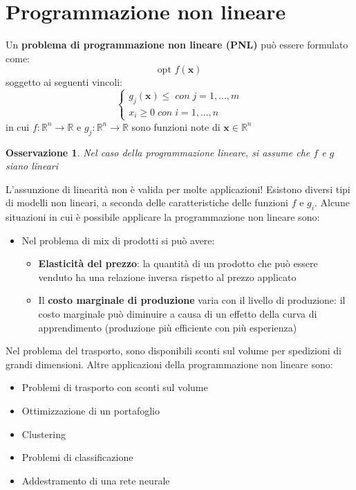 \documentclass[12pt]{article}
\newtheorem{Osservazione}{Osservazione}[subsection]
\begin{document}
\section{Programmazione non lineare}
Un \textbf{problema di programmazione non lineare (PNL)} può essere formulato come:
$$\textrm{opt } f(\boldsymbol{x})$$
soggetto ai seguenti vincoli:
$$\begin{cases}
    g_j(\boldsymbol{x}) \leq \; con \; j = 1,...,m \\
    x_i \geq 0 \; con \; i = 1,...,n
\end{cases}$$
in cui $f:\mathbb{R}^n \rightarrow \mathbb{R}$ e $g_j: \mathbb{R}^n \rightarrow \mathbb{R}$ sono funzioni note di $\boldsymbol{x} \in \mathbb{R}^n$
\begin{Osservazione}
    Nel caso della programmazione lineare, si assume che $f$ e $g$ siano lineari
\end{Osservazione}
L'assunzione di linearità non è valida per molte applicazioni! Esistono diversi tipi di modelli non lineari, a seconda delle caratteristiche delle funzioni
$f$ e $g_i$. Alcune situazioni in cui è possibile applicare la programmazione non lineare sono:
\begin{itemize}
    \item Nel problema di mix di prodotti si può avere:
    \begin{itemize}
        \item \textbf{Elasticità del prezzo}: la quantità di un prodotto che può essere venduto ha una relazione inversa rispetto al prezzo applicato
        \item Il \textbf{costo marginale di produzione} varia con il livello di produzione: il costo marginale può diminuire a causa di un effetto della curva di apprendimento (produzione più efficiente con più esperienza)
    \end{itemize}
\end{itemize}
Nel problema del trasporto, sono disponibili sconti sul volume per spedizioni di grandi dimensioni. Altre applicazioni della programmazione non lineare sono:
\begin{itemize}
    \item Problemi di trasporto con sconti sul volume
    \item Ottimizzazione di un portafoglio
    \item Clustering 
    \item Problemi di classificazione
    \item Addestramento di una rete neurale
\end{itemize}
\end{document}
